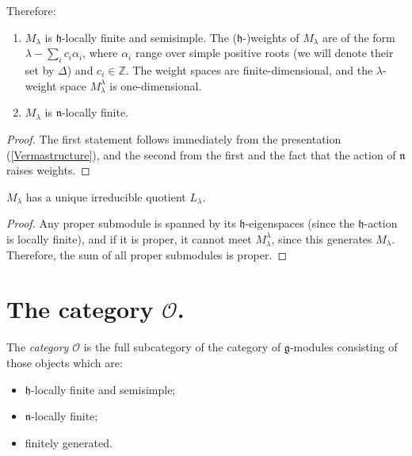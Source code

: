 Therefore:
\begin{lemma}
\label{lemma-properties-Verma}
 \begin{enumerate}
  \item $M_\lambda$ is $\mathfrak h$-locally finite and semisimple. The ($\mathfrak h$-)weights of $M_\lambda$ are of the form $\lambda - \sum_i c_i\alpha_i$, where $\alpha_i$ range over simple positive roots (we will denote their set by $\Delta$) and $c_i\in \mathbb Z$. The weight spaces are finite-dimensional, and the $\lambda$-weight space $M_\lambda^\lambda$ is one-dimensional.
 \item $M_\lambda$ is $\mathfrak n$-locally finite.
 \end{enumerate}
\end{lemma}

\begin{proof}
 The first statement follows immediately from the presentation (\ref{Vermastructure}), and the second from the first and the fact that the action of $\mathfrak n$ raises weights.
\end{proof}

\begin{proposition}
\label{proposition-uniquequotient}
 $M_\lambda$ has a unique irreducible quotient $L_\lambda$. 
\end{proposition}

\begin{proof}
Any proper submodule is spanned by its $\mathfrak h$-eigenspaces (since the $\mathfrak h$-action is locally finite), and 
 if it is proper, it cannot meet $M_\lambda^\lambda$, since this generates $M_\lambda$. Therefore, the sum of all proper submodules is proper.
\end{proof}




\section{The category $\mathcal O$.}
\label{section-category-O}

\begin{definition}
 \label{definition-category-O}
The {\it category $\mathcal O$} is the full subcategory of the category of $\mathfrak g$-modules consisting of those objects which are:
\begin{itemize}
 \item $\mathfrak h$-locally finite and semisimple;
 \item $\mathfrak n$-locally finite;
 \item finitely generated.
\end{itemize}
\end{definition}

